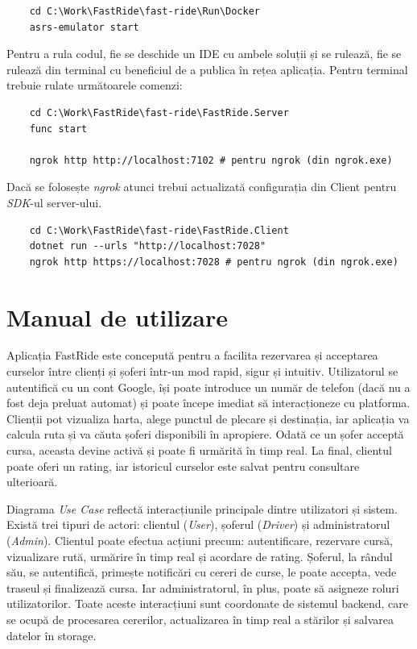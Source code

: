 \begin{verbatim}
    cd C:\Work\FastRide\fast-ride\Run\Docker
    asrs-emulator start
\end{verbatim}

Pentru a rula codul, fie se deschide un IDE cu ambele soluții și se rulează, fie se rulează din terminal
cu beneficiul de a publica în rețea aplicația. Pentru terminal trebuie rulate următoarele comenzi:

\begin{verbatim}
    cd C:\Work\FastRide\fast-ride\FastRide.Server
    func start

    ngrok http http://localhost:7102 # pentru ngrok (din ngrok.exe)
\end{verbatim}

Dacă se folosește \textit{ngrok} atunci trebui actualizată configurația din Client pentru \textit{SDK}-ul server-ului.
\begin{verbatim}
    cd C:\Work\FastRide\fast-ride\FastRide.Client
    dotnet run --urls "http://localhost:7028"
    ngrok http https://localhost:7028 # pentru ngrok (din ngrok.exe)
\end{verbatim}


\section{Manual de utilizare}

Aplicația FastRide este concepută pentru a facilita rezervarea și acceptarea curselor între
clienți și șoferi într-un mod rapid, sigur și intuitiv. Utilizatorul se autentifică
cu un cont Google, își poate introduce un număr de telefon (dacă nu a fost deja 
preluat automat) și poate începe imediat să interacționeze cu platforma.
Clienții pot vizualiza harta, alege punctul de plecare și destinația, iar aplicația
va calcula ruta și va căuta șoferi disponibili în apropiere. Odată ce un șofer 
acceptă cursa, aceasta devine activă și poate fi urmărită în timp real. La final, 
clientul poate oferi un rating, iar istoricul curselor este salvat pentru consultare 
ulterioară.

Diagrama \textit{Use Case} reflectă interacțiunile principale dintre utilizatori și sistem. 
Există trei tipuri de actori: clientul (\textit{User}), șoferul (\textit{Driver}) și administratorul (\textit{Admin}).
Clientul poate efectua acțiuni precum: 
autentificare, rezervare cursă, vizualizare rută, urmărire în timp real și acordare de rating. 
Șoferul, la rândul său, se autentifică, primește 
notificări cu cereri de curse, le poate accepta, vede traseul și finalizează cursa. Iar administratorul, în plus,
poate să asigneze roluri utilizatorilor. 
Toate aceste interacțiuni sunt coordonate de sistemul backend, care se ocupă de procesarea 
cererilor, actualizarea în timp real a stărilor și salvarea datelor în storage.

